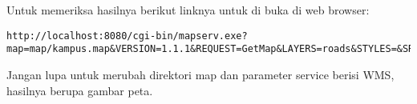 \subitem Untuk memeriksa hasilnya berikut linknya untuk di buka di web browser:
\begin{lstlisting}
http://localhost:8080/cgi-bin/mapserv.exe?map=map/kampus.map&VERSION=1.1.1&REQUEST=GetMap&LAYERS=roads&STYLES=&SRS=EPSG:4326&BBOX=94.5011475,-11.007385,141.01947,6.076721&WIDTH=1024&HEIGHT=768&FORMAT=image/png
\end{lstlisting}
Jangan lupa untuk merubah direktori map dan parameter service berisi WMS, hasilnya berupa gambar peta.